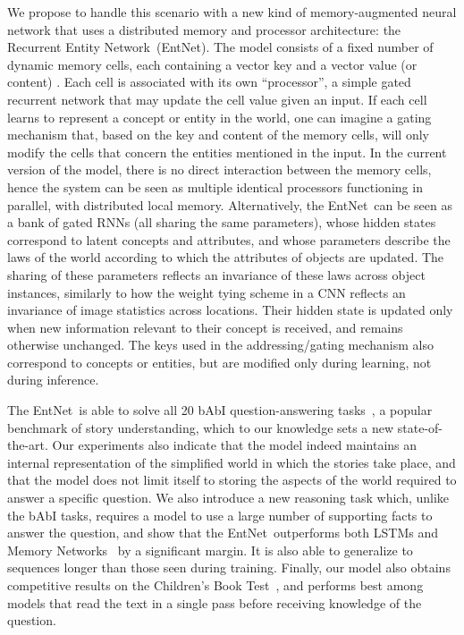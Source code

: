 \documentclass{article} \usepackage{iclr2016_conference,times}
\newcommand{\modelname}{Recurrent Entity Network}
\newcommand{\modelabbrev}{EntNet}
\begin{document}
We propose to handle this scenario with a new kind of
memory-augmented neural network that uses a distributed memory and processor
architecture: the \modelname~(\modelabbrev). The model consists
of a fixed number of dynamic memory cells, each containing a vector
key  and a vector value (or content) . Each cell is
associated with its own ``processor'', a simple gated recurrent
network that may update the cell value given an input. If each
cell learns to represent a concept or entity in the world, one can imagine a gating
mechanism that, based on the key and content of the memory cells, will
only modify the cells that concern the entities mentioned in the
input. In the current version of the model, there is no direct
interaction between the memory cells, hence the system can be seen as
multiple identical processors functioning in parallel, with
distributed local memory. Alternatively, the \modelabbrev~can be seen as a
bank of gated RNNs (all sharing the same parameters), whose hidden
states correspond to latent concepts and attributes, and whose parameters describe the laws of the world according to which the attributes of objects are updated.
The sharing of these parameters reflects an invariance of these laws across object instances, similarly to how the weight tying scheme in a CNN reflects an invariance of image statistics across locations.
Their hidden state
is updated only when new information relevant to their concept is
received, and remains otherwise unchanged. The keys used in the
addressing/gating mechanism also correspond to concepts or entities,
but are modified only during learning, not during inference.

The \modelabbrev~is able to solve all 20 bAbI question-answering tasks~\citep{babi}, a popular benchmark of story understanding, which to our knowledge sets a new state-of-the-art.
Our experiments also indicate that the model indeed maintains an internal representation of the simplified world in which the stories take place, and that the model does not limit itself to storing the aspects of the world required to answer a specific question.
We also introduce a new reasoning task which, unlike the bAbI tasks, requires a model to use a large number of supporting facts to answer the question, and show that the \modelabbrev~outperforms both LSTMs and Memory Networks~\citep{MemN2N} by a significant margin. It is also able to generalize to sequences longer than those seen during training.
Finally, our model also obtains competitive results on the
Children’s Book Test~\citep{CBT}, and performs best among models that read the text in a single pass before receiving
knowledge of the question.
\end{document}
